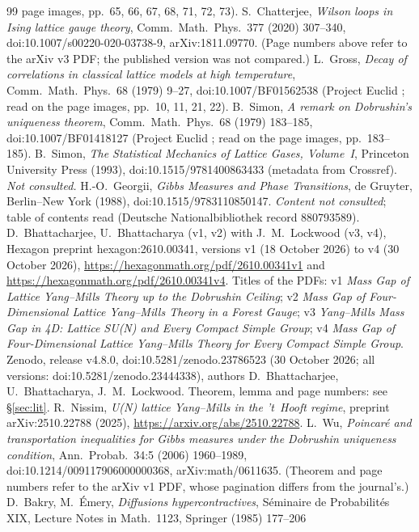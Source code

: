 \documentclass[11pt,a4paper]{article}
\theoremstyle{remark}
\theoremstyle{definition}
\theoremstyle{plain}
\theoremstyle{remark}
\begin{document}
\begin{thebibliography}{99}
page images, pp.~65, 66, 67, 68, 71, 72, 73).
 S.~Chatterjee, \emph{Wilson loops in Ising lattice gauge theory}, Comm.\ Math.\ Phys.\ 377
(2020) 307--340, doi:10.1007/s00220-020-03738-9, arXiv:1811.09770. (Page numbers above refer to the arXiv v3
PDF; the published version was not compared.)
 L.~Gross, \emph{Decay of correlations in classical lattice models at high temperature},
Comm.\ Math.\ Phys.\ 68 (1979) 9--27, doi:10.1007/BF01562538 (Project Euclid ; read on the
page images, pp.~10, 11, 21, 22).
 B.~Simon, \emph{A remark on Dobrushin's uniqueness theorem}, Comm.\ Math.\ Phys.\ 68 (1979)
183--185, doi:10.1007/BF01418127 (Project Euclid ; read on the page images, pp.~183--185).
 B.~Simon, \emph{The Statistical Mechanics of Lattice Gases, Volume~I}, Princeton University
Press (1993), doi:10.1515/9781400863433 (metadata from Crossref). \emph{Not consulted.}
 H.-O.~Georgii, \emph{Gibbs Measures and Phase Transitions}, de Gruyter, Berlin--New York (1988),
doi:10.1515/9783110850147. \emph{Content not consulted}; table of contents read (Deutsche Nationalbibliothek
record 880793589).
 D.~Bhattacharjee, U.~Bhattacharya (v1, v2) with J.~M.~Lockwood (v3, v4), Hexagon preprint hexagon:2610.00341, versions v1 (18 October 2026) to v4 (30 October 2026),
\url{https://hexagonmath.org/pdf/2610.00341v1} and \url{https://hexagonmath.org/pdf/2610.00341v4}. Titles of the PDFs: v1 \emph{Mass Gap of Lattice Yang--Mills Theory up to the Dobrushin Ceiling};
v2 \emph{Mass Gap of Four-Dimensional Lattice Yang--Mills Theory in a Forest Gauge}; v3 \emph{Yang--Mills Mass Gap in 4D: Lattice SU(N) and Every Compact Simple Group};
v4 \emph{Mass Gap of Four-Dimensional Lattice Yang--Mills Theory for Every Compact Simple Group}. Zenodo, release v4.8.0, doi:10.5281/zenodo.23786523 (30 October 2026; all versions: doi:10.5281/zenodo.23444338),
authors D.~Bhattacharjee, U.~Bhattacharya, J.~M.~Lockwood. Theorem, lemma and page numbers: see \S\ref{sec:lit}.
 R.~Nissim, \emph{U(N) lattice Yang--Mills in the 't~Hooft regime}, preprint arXiv:2510.22788 (2025), \url{https://arxiv.org/abs/2510.22788}.
 L.~Wu, \emph{Poincar\'e and transportation inequalities for Gibbs measures under the Dobrushin uniqueness condition}, Ann.\ Probab.\ 34:5 (2006)
1960--1989, doi:10.1214/009117906000000368, arXiv:math/0611635. (Theorem and page numbers refer to the arXiv v1 PDF, whose pagination differs from the journal's.)
 D.~Bakry, M.~\'Emery, \emph{Diffusions hypercontractives}, S\'eminaire de Probabilit\'es XIX, Lecture Notes in Math.\ 1123, Springer (1985) 177--206

\end{thebibliography}
\end{document}
